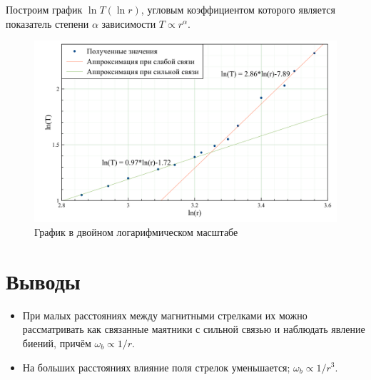 \documentclass{letask}
\begin{document}
\begin{table}[H]
\centering
{}
\caption{Данные эксперимента}
\end{table}

Построим график $\ln T(\ln r)$, угловым коэффициентом которого является показатель степени $\alpha$ зависимости $T \propto r^\alpha$.

\begin{figure}[H]
\centering
\includegraphics[width = 0.8 \tw]{Logarithmic}
\caption{График в двойном логарифмическом масштабе}
\end{figure}


\section{Выводы}
\begin{itemize}
\item При малых расстояниях между магнитными стрелками их можно рассматривать как связанные маятники с сильной связью и наблюдать явление биений, причём $\omega_b \propto 1/r$.

\item На больших расстояниях влияние поля стрелок уменьшается; $\omega_b \propto 1/r^3$.
\end{itemize}
\end{document}
